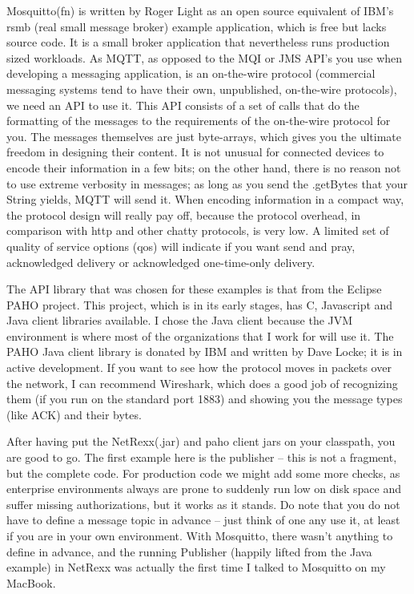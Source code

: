 Mosquitto(fn) is written by Roger Light as an open source equivalent of IBM’s rsmb (real small message broker) example application, which is free but lacks source code. It is a small broker application that nevertheless runs production sized workloads. As MQTT, as opposed to the MQI or JMS API’s you use when developing a messaging application, is an on-the-wire protocol (commercial messaging systems tend to have their own, unpublished, on-the-wire protocols), we need an API to use it. This API consists of a set of calls that do the formatting of the messages to the requirements of the on-the-wire protocol for you. The messages themselves are just byte-arrays, which gives you the ultimate freedom in designing their content. It is not unusual for connected devices to encode their information in a few bits; on the other hand, there is no reason not to use extreme verbosity in messages; as long as you send the .getBytes that your String yields, MQTT will send it. When encoding information in a compact way, the protocol design will really pay off, because the protocol overhead, in comparison with http and other chatty protocols, is very low. A limited set of quality of service options (qos) will indicate if you want send and pray, acknowledged delivery or acknowledged one-time-only delivery.
 
The API library that was chosen for these examples is that from the Eclipse PAHO project. This project, which is in its early stages, has C, Javascript and Java client libraries available. I chose the Java client because the JVM environment is where most of the organizations that I work for will use it. The PAHO Java client library is donated by IBM and written by Dave Locke; it is in active development. If you want to see how the protocol moves in packets over the network, I can recommend Wireshark, which does a good job of recognizing them (if you run on the standard port 1883) and showing you the message types (like ACK) and their bytes.
 
After having put the NetRexx(.jar) and paho client jars on your classpath, you are good to go. The first example here is the publisher – this is not a fragment, but the complete code. For production code we might add some more checks, as enterprise environments always are prone to suddenly run low on disk space and suffer missing authorizations, but it works as it stands. Do note that you do not have to define a message topic in advance – just think of one any use it, at least if you are in your own environment. With Mosquitto, there wasn’t anything to define in advance, and the running Publisher (happily lifted from the Java example) in NetRexx was actually the first time I talked to Mosquitto on my MacBook.
 
